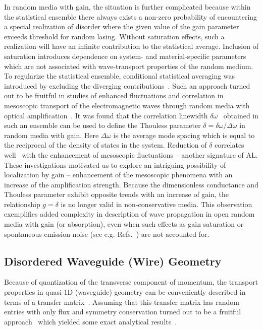 In random media with gain, the situation is further complicated because within the statistical ensemble there always exists a non-zero probability of encountering a special realization of disorder where the given value of the gain parameter exceeds threshold for random lasing. Without saturation effects, such a realization will have an infinite contribution to the statistical average. Inclusion of saturation introduces dependence on system- and material-specific parameters which are not associated with wave-transport properties of the random medium. To regularize the statistical ensemble, conditional statistical averaging was introduced by excluding the diverging contributions~\cite{2005_Yamilov_correlations}. Such an approach turned out to be fruitful in studies of enhanced fluctuations and  correlation in mesoscopic transport of the electromagnetic waves through random media with optical amplification~\cite{2004_Yamilov_intensity,2006_Yamilov_conductance,2005_Yamilov_correlations}. It was found that the correlation linewidth $\delta\omega$~\cite{2000_Sebbah} obtained in such an ensemble can be used to define the Thouless parameter $\delta=\delta\omega/\Delta\omega$ in random media with gain. Here $\Delta\omega$ is the average mode spacing which is equal to the reciprocal of the density of states in the system.  Reduction of $\delta$ correlates well~\cite{2005_Yamilov_correlations} with the enhancement of mesoscopic fluctuations -- another signature of AL. These investigations motivated us to explore an intriguing possibility of localization by gain -- enhancement of the mesoscopic phenomena with an increase of the amplification strength. Because the dimensionless conductance and Thouless parameter exhibit opposite trends with an increase of gain, the relationship $g=\delta$ is no longer valid in non-conservative media. This observation exemplifies added complexity in description of wave propagation in open random media with gain (or absorption), even when such effects as gain saturation or spontaneous emission noise (see e.g. Refs.~\cite{1999_Patra_noise,2009_Skipetrov_noise}) are not accounted for.

\subsection{Disordered Waveguide (Wire) Geometry}

Because of quantization of the transverse component of momentum, the transport properties in quasi-1D (waveguide)  geometry can be conveniently described in terms of a transfer matrix~\cite{1997_Beenakker}. Assuming that this transfer matrix has random entries with only flux and symmetry conservation turned out to be a fruitful approach~\cite{2004_Mello_Kumar_book} which yielded some exact analytical results~\cite{1994_Beenakker_exact,2000_Mirlin}.

